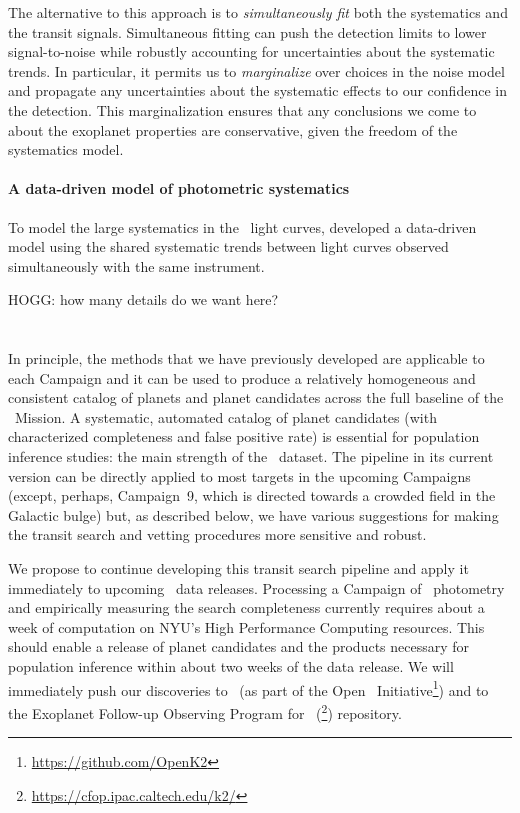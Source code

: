 \documentclass[12pt,preprint]{aastex}
\newcommand{\github}{\project{GitHub}}
\begin{document}
The alternative to this approach is to \emph{simultaneously fit} both the
systematics and the transit signals.
Simultaneous fitting can push the detection limits to lower signal-to-noise
while robustly accounting for uncertainties about the systematic trends.
In particular, it permits us to \emph{marginalize} over choices in the noise
model and propagate any uncertainties about the systematic effects
to our confidence in the detection.
This marginalization ensures that any conclusions we come to about the
exoplanet properties are conservative, given the freedom of the systematics
model.

\paragraph{A data-driven model of photometric systematics}

To model the large systematics in the \ketu\ light curves,
\citet{Foreman-Mackey:2015} developed a data-driven model using the shared
systematic trends between light curves observed simultaneously with the same
instrument.

HOGG: how many details do we want here?


\section{\thecatalog}

In principle, the methods that we have previously developed
\citep{Foreman-Mackey:2015} are applicable to each Campaign and it can be used
to produce a relatively homogeneous and consistent catalog of planets and
planet candidates across the full baseline of the \kt\ Mission.
A systematic, automated catalog of planet candidates (with characterized
completeness and false positive rate) is essential for population inference
studies: the main strength of the \kt\ dataset.
The pipeline in its current version can be directly applied to most targets in
the upcoming Campaigns (except, perhaps, Campaign~9, which is directed towards
a crowded field in the Galactic bulge) but, as described below, we have
various suggestions for making the transit search and vetting procedures more
sensitive and robust.

We propose to continue developing this transit search pipeline and apply it
immediately to upcoming \kt\ data releases.
Processing a Campaign of \kt\ photometry and empirically measuring the search
completeness currently requires about a week of computation on NYU's High
Performance Computing resources.
This should enable a release of planet candidates and the products necessary
for population inference within about two weeks of the data release.
We will immediately push our discoveries to \github\ (as part of the Open \kt\
Initiative\footnote{\url{https://github.com/OpenK2}}) and to the Exoplanet
Follow-up Observing Program for \kt\
(\project{ExoFOP-K2}\footnote{\url{https://cfop.ipac.caltech.edu/k2/}})
repository.
\end{document}
